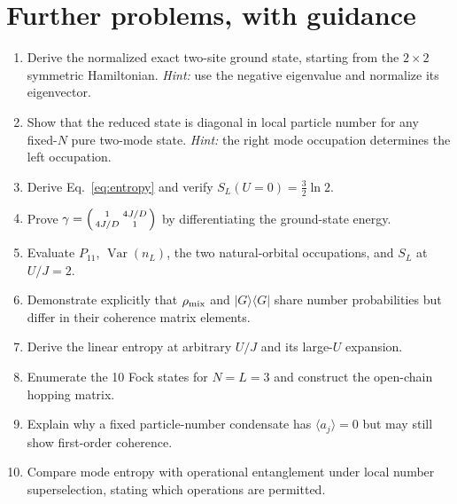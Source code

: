 \documentclass[11pt,a4paper]{article}
\begin{document}
\section{Further problems, with guidance}
\begin{enumerate}[leftmargin=*,itemsep=4pt]
\item Derive the normalized exact two-site ground state, starting from the $2\times2$ symmetric Hamiltonian. \emph{Hint:} use the negative eigenvalue and normalize its eigenvector.
\item Show that the reduced state is diagonal in local particle number for any fixed-$N$ pure two-mode state. \emph{Hint:} the right mode occupation determines the left occupation.
\item Derive Eq.~\eqref{eq:entropy} and verify $S_L(U=0)=\tfrac32\ln2$.
\item Prove $\gamma=\begin{psmallmatrix}1&4J/D\\4J/D&1\end{psmallmatrix}$ by differentiating the ground-state energy.
\item Evaluate $P_{11}$, $\operatorname{Var}(n_L)$, the two natural-orbital occupations, and $S_L$ at $U/J=2$.
\item Demonstrate explicitly that $\rho_{\rm mix}$ and $|G\rangle\langle G|$ share number probabilities but differ in their coherence matrix elements.
\item Derive the linear entropy at arbitrary $U/J$ and its large-$U$ expansion.
\item Enumerate the 10 Fock states for $N=L=3$ and construct the open-chain hopping matrix.
\item Explain why a fixed particle-number condensate has $\langle a_j\rangle=0$ but may still show first-order coherence.
\item Compare mode entropy with operational entanglement under local number superselection, stating which operations are permitted.
\end{enumerate}
\end{document}
